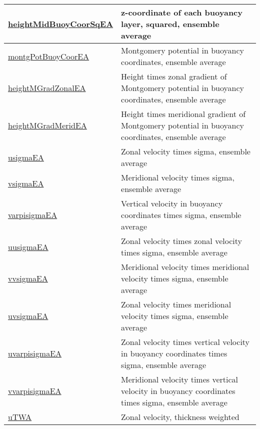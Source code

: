 {\begin{center}
\begin{longtable}{| p{2.0in} | p{4.0in} |}
    \hline
    \hyperref[subsec:var_sec_eliassenPalmAM_heightMidBuoyCoorSqEA]{heightMidBuoyCoorSqEA} & z-coordinate of each buoyancy layer, squared, ensemble average \\
    \hline
    \hyperref[subsec:var_sec_eliassenPalmAM_montgPotBuoyCoorEA]{montgPotBuoyCoorEA} & Montgomery potential in buoyancy coordinates, ensemble average \\
    \hline
    \hyperref[subsec:var_sec_eliassenPalmAM_heightMGradZonalEA]{heightMGradZonalEA} & Height times zonal gradient of Montgomery potential in buoyancy coordinates, ensemble average \\
    \hline
    \hyperref[subsec:var_sec_eliassenPalmAM_heightMGradMeridEA]{heightMGradMeridEA} & Height times meridional gradient of Montgomery potential in buoyancy coordinates, ensemble average \\
    \hline
    \hyperref[subsec:var_sec_eliassenPalmAM_usigmaEA]{usigmaEA} & Zonal velocity times sigma, ensemble average \\
    \hline
    \hyperref[subsec:var_sec_eliassenPalmAM_vsigmaEA]{vsigmaEA} & Meridional velocity times sigma, ensemble average \\
    \hline
    \hyperref[subsec:var_sec_eliassenPalmAM_varpisigmaEA]{varpisigmaEA} & Vertical velocity in buoyancy coordinates times sigma, ensemble average \\
    \hline
    \hyperref[subsec:var_sec_eliassenPalmAM_uusigmaEA]{uusigmaEA} & Zonal velocity times zonal velocity times sigma, ensemble average \\
    \hline
    \hyperref[subsec:var_sec_eliassenPalmAM_vvsigmaEA]{vvsigmaEA} & Meridional velocity times meridional velocity times sigma, ensemble average \\
    \hline
    \hyperref[subsec:var_sec_eliassenPalmAM_uvsigmaEA]{uvsigmaEA} & Zonal velocity times meridional velocity times sigma, ensemble average \\
    \hline
    \hyperref[subsec:var_sec_eliassenPalmAM_uvarpisigmaEA]{uvarpisigmaEA} & Zonal velocity times vertical velocity in buoyancy coordinates times sigma, ensemble average \\
    \hline
    \hyperref[subsec:var_sec_eliassenPalmAM_vvarpisigmaEA]{vvarpisigmaEA} & Meridional velocity times vertical velocity in buoyancy coordinates times sigma, ensemble average \\
    \hline
    \hyperref[subsec:var_sec_eliassenPalmAM_uTWA]{uTWA} & Zonal velocity, thickness weighted \\
    \hline

\end{longtable}
\end{center}}
